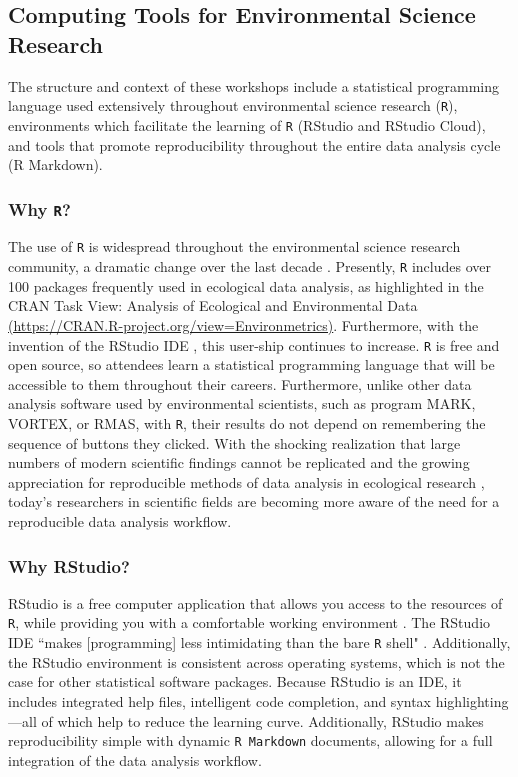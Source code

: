 \documentclass[12pt]{article}
\begin{document}
\subsection{Computing Tools for Environmental Science Research}  

\quad The structure and context of these workshops include a statistical
programming language used extensively throughout environmental science research
(\texttt{R}), environments which facilitate the learning of \texttt{R}
(RStudio and RStudio Cloud), and tools that promote reproducibility throughout
the entire data analysis cycle (R Markdown).

\subsubsection{Why \texttt{R}?} 

\quad The use of \texttt{R} is widespread throughout the environmental science
research community, a dramatic change over the last decade \citep{Rpopular}. 
Presently, \texttt{R} includes over 100 packages frequently used in ecological
data analysis, as highlighted in the CRAN Task View: Analysis of Ecological and
Environmental Data \href{https://CRAN.R-project.org/view=Environmetrics}{(https://CRAN.R-project.org/view=Environmetrics)}. Furthermore, with the invention of the RStudio IDE 
\citep{rstudio}, this user-ship continues to increase. \texttt{R} is free and
open source, so attendees learn a statistical programming language that will be
accessible to them throughout their careers. Furthermore, unlike other data
analysis software used by environmental scientists, such as program MARK,
VORTEX, or RMAS, with \texttt{R}, their results do not depend on remembering the
sequence of buttons they clicked. With the shocking realization that large 
numbers of modern scientific findings cannot be replicated \citep{economist, 
johnson} and the growing appreciation for reproducible methods of data analysis
in ecological research \citep{reproducibilty-comment, repeatability, pva,
reproducibility_ecology}, today's researchers in scientific fields are becoming 
more aware of the need for a reproducible data analysis workflow. 

\subsubsection{Why RStudio?}

\quad RStudio is a free computer application that allows you access to the 
resources of \texttt{R}, while providing you with a comfortable working
environment \citep{rstudio}. The RStudio IDE ``makes [programming] less 
intimidating than the bare \texttt{R} shell" \citep[p. 59]{mine}. Additionally, 
the RStudio environment is consistent across operating systems, which is not the
case for other statistical software packages. Because RStudio is an IDE, it
includes integrated help files, intelligent code completion, and syntax
highlighting---all of which help to reduce the learning curve. Additionally,
RStudio makes reproducibility simple with dynamic \texttt{R Markdown} documents,
allowing for a full integration of the data analysis workflow.
\end{document}
